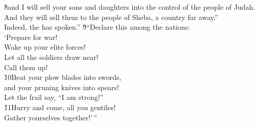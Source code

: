 \begin{poetry}
\poeml \v{8}and I will sell your sons and daughters into the control of the people of Judah. \\
\poemll    And they will sell them to the people of Sheba, a country far away.'' \\
\poemlll       Indeed, the  has spoken.''
\poeml \v{9}``Declare this among the nations: \\
\poemll    `Prepare for war! \\
\poeml Wake up your elite forces! \\
\poemll    Let all the soldiers draw near! \\
\poemlll       Call them up! \\
\poeml \v{10}Beat your plow blades into swords, \\
\poemll    and your pruning knives into spears! \\
\poemlll       Let the frail say, ``I am strong!'' \\
\poeml \v{11}Hurry and come, all you gentiles! \\
\poemll    Gather yourselves together!'\,''
\end{poetry}

